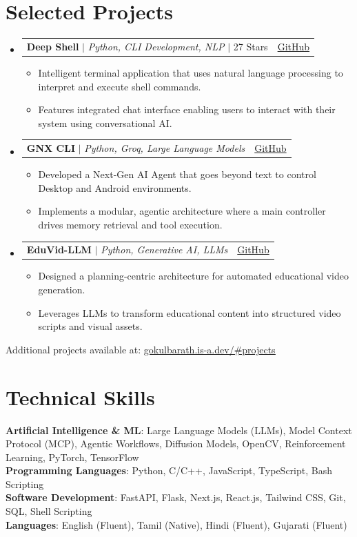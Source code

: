 \documentclass[letterpaper,11pt]{article}
\makeatletter
\newcommand{\resumeItem}[1]{
  \item\small{
    {#1 \vspace{-2pt}}
  }
}
\newcommand{\resumeProjectHeading}[2]{
    \item
    \begin{tabular*}{0.97\textwidth}{l@{\extracolsep{\fill}}r}
      \small#1 & #2 \\
    \end{tabular*}\vspace{-7pt}
}
\newcommand{\resumeSubHeadingListStart}{\begin{itemize}[leftmargin=0.15in, label={}]}
\newcommand{\resumeSubHeadingListEnd}{\end{itemize}}
\newcommand{\resumeItemListStart}{\begin{itemize}}
\newcommand{\resumeItemListEnd}{\end{itemize}\vspace{-5pt}}
\makeatother
\begin{document}
\section{Selected Projects}
    \resumeSubHeadingListStart
      \resumeProjectHeading
          {\textbf{Deep Shell} $|$ \emph{Python, CLI Development, NLP} $|$ 27 Stars}{\href{https://gokulbarath.is-a.dev/\#projects}{GitHub}}
          \resumeItemListStart
            \resumeItem{Intelligent terminal application that uses natural language processing to interpret and execute shell commands.}
            \resumeItem{Features integrated chat interface enabling users to interact with their system using conversational AI.}
          \resumeItemListEnd
      \resumeProjectHeading
          {\textbf{GNX CLI} $|$ \emph{Python, Groq, Large Language Models}}{\href{https://github.com/gokul6350/gnx-cli}{GitHub}}
          \resumeItemListStart
            \resumeItem{Developed a Next-Gen AI Agent that goes beyond text to control Desktop and Android environments.}
            \resumeItem{Implements a modular, agentic architecture where a main controller drives memory retrieval and tool execution.}
          \resumeItemListEnd
      \resumeProjectHeading
          {\textbf{EduVid-LLM} $|$ \emph{Python, Generative AI, LLMs}}{\href{https://gokulbarath.is-a.dev/\#projects}{GitHub}}
          \resumeItemListStart
            \resumeItem{Designed a planning-centric architecture for automated educational video generation.}
            \resumeItem{Leverages LLMs to transform educational content into structured video scripts and visual assets.}
          \resumeItemListEnd
    \resumeSubHeadingListEnd
    
    \vspace{-5pt}
    \small{Additional projects available at: \href{https://gokulbarath.is-a.dev/\#projects}{\underline{gokulbarath.is-a.dev/\#projects}}}


\section{Technical Skills}
 \begin{itemize}[leftmargin=0.15in, label={}]
    \small{\item{
     \textbf{Artificial Intelligence \& ML}{: Large Language Models (LLMs), Model Context Protocol (MCP), Agentic Workflows, Diffusion Models, OpenCV, Reinforcement Learning, PyTorch, TensorFlow} \\
     \textbf{Programming Languages}{: Python, C/C++, JavaScript, TypeScript, Bash Scripting} \\
     \textbf{Software Development}{: FastAPI, Flask, Next.js, React.js, Tailwind CSS, Git, SQL, Shell Scripting} \\
     \textbf{Languages}{: English (Fluent), Tamil (Native), Hindi (Fluent), Gujarati (Fluent)}
    }}
 \end{itemize}
\end{document}
